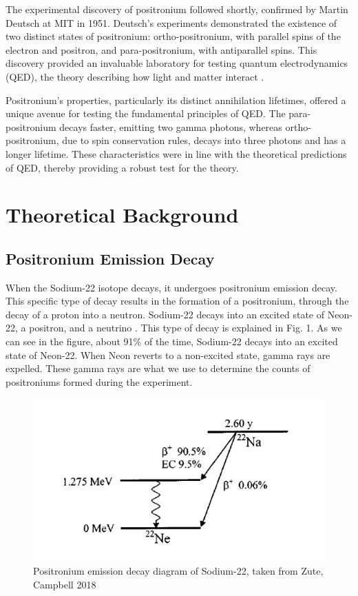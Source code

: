 \documentclass[10pt,letterpaper]{article}
\begin{document}
The experimental discovery of positronium followed shortly, confirmed by Martin Deutsch at MIT in 1951. Deutsch's experiments demonstrated the existence of two distinct states of positronium: ortho-positronium, with parallel spins of the electron and positron, and para-positronium, with antiparallel spins. This discovery provided an invaluable laboratory for testing quantum electrodynamics (QED), the theory describing how light and matter interact \cite{Yuly:1999}.

Positronium's properties, particularly its distinct annihilation lifetimes, offered a unique avenue for testing the fundamental principles of QED. The para-positronium decays faster, emitting two gamma photons, whereas ortho-positronium, due to spin conservation rules, decays into three photons and has a longer lifetime. These characteristics were in line with the theoretical predictions of QED, thereby providing a robust test for the theory.
\section{Theoretical Background}
\subsection{Positronium Emission Decay}
When the Sodium-22 isotope decays, it undergoes positronium emission decay. This specific type of decay results in 
the formation of a positronium, through the decay of a proton into a neutron. Sodium-22 decays into an excited state 
of Neon-22, a positron, and a neutrino \cite{Zute:2018}. This type of decay is explained in Fig. 1. As we can see in the figure,
about 91\% of the time, Sodium-22 decays into an excited state of Neon-22. When Neon reverts to a non-excited state, gamma rays 
are expelled. These gamma rays are what we use to determine the counts of positroniums formed during the experiment.
\begin{figure}[ht]
    \begin{center}
        \includegraphics[width=4.5in]{decay.png}
        \caption{Positronium emission decay diagram of Sodium-22, taken from Zute, Campbell 2018}
    \end{center}
\end{figure}
\end{document}
